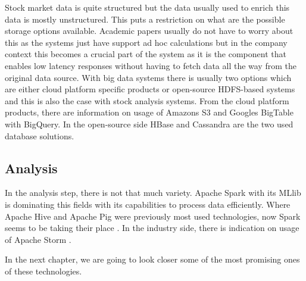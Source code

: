 Stock market data is quite structured but the data usually used to enrich this data is mostly unstructured.
This puts a restriction on what are the possible storage options available.
Academic papers usually do not have to worry about this as the systems just have support ad hoc calculations but in the company context this becomes a crucial part of the system as it is the component that enables low latency responses without having to fetch data all the way from the original data source.
With big data systems there is usually two options which are either cloud platform specific products or open-source HDFS-based systems and this is also the case with stock analysis systems.
From the cloud platform products, there are information on usage of Amazons S3 and Googles BigTable with BigQuery. \cite{snively} \cite{palmer}
In the open-source side HBase \cite{gu} and Cassandra are the two used database solutions.

\subsection{Analysis}

In the analysis step, there is not that much variety.
Apache Spark with its MLlib is dominating this fields with its capabilities to process data efficiently. \cite{islam} \cite{chen} \cite{chungho} \cite{adresic}
Where Apache Hive and Apache Pig were previously most used technologies, now Spark seems to be taking their place \cite{snively}.
In the industry side, there is indication on usage of Apache Storm \cite{juan}.

In the next chapter, we are going to look closer some of the most promising ones of these technologies.